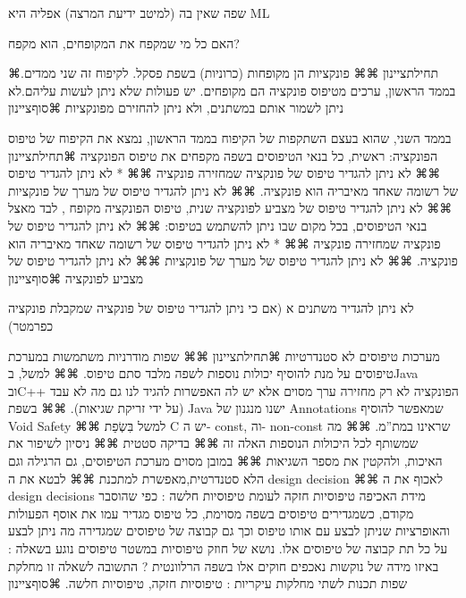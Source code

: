       שפה שאין בה (למיטב ידיעת המרצה) אפליה היא ML

      האם כל מי שמקפח את המקופחים, הוא מקפח?

      ⌘תחילת{ציינון}
      ⌘⌘ פונקציות הן מקופחות (כרוניות) בשפת פסקל. לקיפוח זה שני ממדים.
      בממד הראשון, ערכים מטיפוס פונקציה הם מקופחים. יש פעולות שלא ניתן לעשות עליהם.לא ניתן לשמור אותם במשתנים, ולא ניתן להחזירם מפונקציות
  ⌘סוף{ציינון}

      בממד השני, שהוא בעצם השתקפות של הקיפוח בממד הראשון, נמצא את הקיפוח של טיפוס הפונקציה:
      ראשית, כל בנאי הטיפוסים בשפה מקפחים את טיפוס הפונקציה
      ⌘תחילת{ציינון}
      ⌘⌘ לא ניתן להגדיר טיפוס של פונקציה שמחזירה פונקציה
      ⌘⌘ * לא ניתן להגדיר טיפוס של רשומה שאחד מאיבריה הוא פונקציה.
      ⌘⌘ לא ניתן להגדיר טיפוס של מערך של פונקציות
      ⌘⌘ לא ניתן להגדיר טיפוס של מצביע לפונקציה
      שנית, טיפוס הפונקציה מקופח , לבד מאצל בנאי הטיפוסים, בכל מקום שבו ניתן להשתמש בטיפוס:
      ⌘⌘ לא ניתן להגדיר טיפוס של פונקציה שמחזירה פונקציה
      ⌘⌘ * לא ניתן להגדיר טיפוס של רשומה שאחד מאיבריה הוא פונקציה.
      ⌘⌘ לא ניתן להגדיר טיפוס של מערך של פונקציות
      ⌘⌘ לא ניתן להגדיר טיפוס של מצביע לפונקציה
    ⌘סוף{ציינון}

      לא ניתן להגדיר משתנים א
      (אם כי ניתן להגדיר טיפוס של פונקציה שמקבלת פונקציה כפרמטר)

      מערכות טיפוסים לא סטנדרטיות
      ⌘תחילת{ציינון}
      ⌘⌘ שפות מודרניות משתמשות במערכת טיפוסים על מנת להוסיף יכולות נוספות לשפה מלבד סתם טיפוס.
      ⌘⌘ למשל, בJava ובC++ הפונקציה לא רק מחזירה ערך מסוים אלא יש לה האפשרות להגיד לנו גם מה לא עבד (על ידי זריקת שגיאות).
      ⌘⌘ בשפת Java ישנו מנגנון של Annotations שמאפשר להוסיף Void Safety
      ⌘⌘ למשל בִּשְׂפַת C יש ה- const, וה- non-const שראינו במת”מ.
      ⌘⌘ מה שמשותף לכל היכולות הנוספות האלה זה
      ⌘⌘ בדיקה סטטית
      ⌘⌘ ניסיון לשיפור את האיכות, ולהקטין את מספר השגיאות
      ⌘⌘ במובן מסוים מערכת הטיפוסים, גם הרגילה וגם הלא סטנדרטית,מאפשרת למתכנת
      ⌘⌘ לבטא את ה design decision
      ⌘⌘ לאכוף את ה design decisions
      מידת האכיפה
      טיפוסיות חזקה לעומת טיפוסיות חלשה : כפי שהוסבר מקודם, כשמגדירים טיפוסים בשפה מסוימת, כל טיפוס מגדיר עמו את אוסף הפעולות והאופרציות שניתן לבצע עם אותו טיפוס וכך גם קבוצה של טיפוסים שמגדירה מה ניתן לבצע על כל תת קבוצה של טיפוסים אלו. נושא של חוזק טיפוסיות במשטר טיפוסים נוגע בשאלה : באיזו מידה של נוקשות נאכפים חוקים אלו בשפה הרלוונטית ?
      התשובה לשאלה זו מחלקת שפות תכנות לשתי מחלקות עיקריות : טיפוסיות חזקה, טיפוסיות חלשה.
  ⌘סוף{ציינון}

